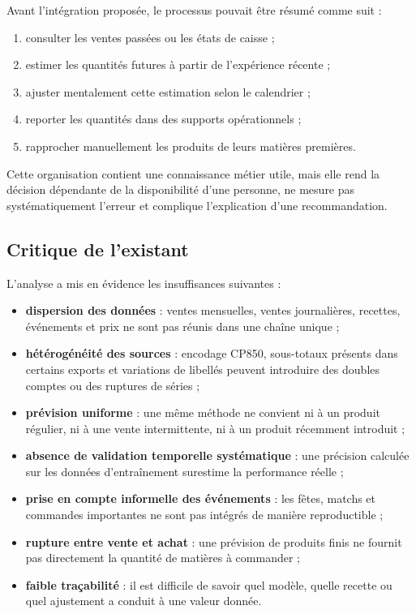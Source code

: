 Avant l'intégration proposée, le processus pouvait être résumé comme suit :

\begin{enumerate}
  \item consulter les ventes passées ou les états de caisse ;
  \item estimer les quantités futures à partir de l'expérience récente ;
  \item ajuster mentalement cette estimation selon le calendrier ;
  \item reporter les quantités dans des supports opérationnels ;
  \item rapprocher manuellement les produits de leurs matières premières.
\end{enumerate}

Cette organisation contient une connaissance métier utile, mais elle rend la
décision dépendante de la disponibilité d'une personne, ne mesure pas
systématiquement l'erreur et complique l'explication d'une recommandation.

\subsection{Critique de l'existant}

L'analyse a mis en évidence les insuffisances suivantes :

\begin{itemize}
  \item \textbf{dispersion des données} : ventes mensuelles, ventes journalières,
  recettes, événements et prix ne sont pas réunis dans une chaîne unique ;
  \item \textbf{hétérogénéité des sources} : encodage CP850, sous-totaux présents
  dans certains exports et variations de libellés peuvent introduire des doubles
  comptes ou des ruptures de séries ;
  \item \textbf{prévision uniforme} : une même méthode ne convient ni à un produit
  régulier, ni à une vente intermittente, ni à un produit récemment introduit ;
  \item \textbf{absence de validation temporelle systématique} : une précision
  calculée sur les données d'entraînement surestime la performance réelle ;
  \item \textbf{prise en compte informelle des événements} : les fêtes, matchs et
  commandes importantes ne sont pas intégrés de manière reproductible ;
  \item \textbf{rupture entre vente et achat} : une prévision de produits finis ne
  fournit pas directement la quantité de matières à commander ;
  \item \textbf{faible traçabilité} : il est difficile de savoir quel modèle,
  quelle recette ou quel ajustement a conduit à une valeur donnée.
\end{itemize}

